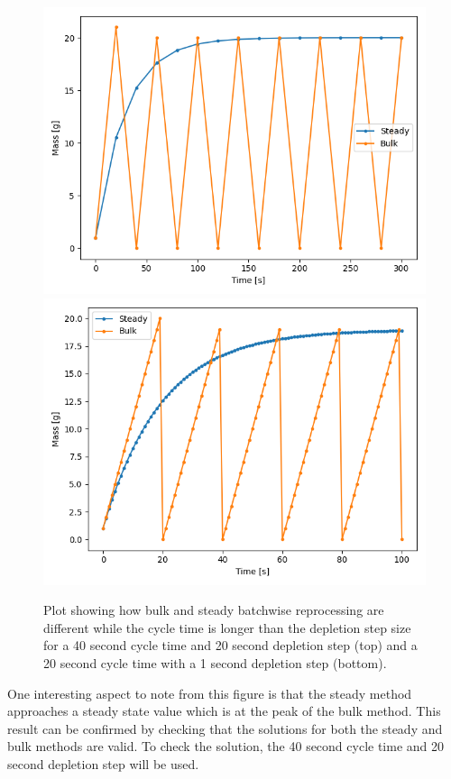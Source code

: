 \begin{figure}[H]
  \centering
  \includegraphics[scale=0.75]{images/batch-40-20.png}
  \includegraphics[scale=0.75]{images/batch-20-1.png}
  \caption{Plot showing how bulk and steady batchwise reprocessing are different while the cycle time is longer than the depletion step size for a 40 second cycle time and 20 second depletion step (top) and a 20 second cycle time with a 1 second depletion step (bottom).}
   \label{fig:bulk_repr_diff}
\end{figure}

One interesting aspect to note from this figure is that the steady method approaches a steady state value which is at the peak of the bulk method. This result can be confirmed by checking that the solutions for both the steady and bulk methods are valid. To check the solution, the 40 second cycle time and 20 second depletion step will be used.

